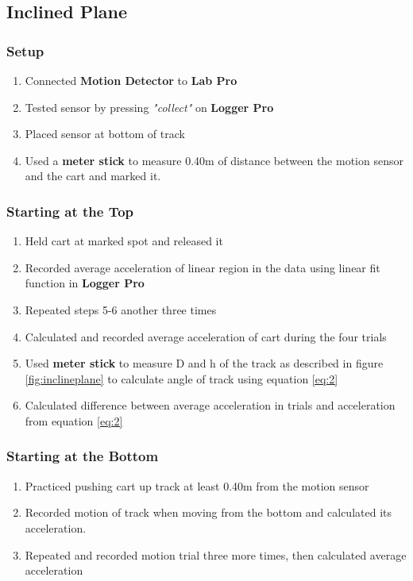 \subsection{Inclined Plane}

\subsubsection{Setup}

	\begin{enumerate}
		\item Connected \textbf{Motion Detector} to \textbf{Lab Pro} 
		\item Tested sensor by pressing \textit{"collect"} on \textbf{Logger Pro}
		\item Placed sensor at bottom of track
		\item Used a \textbf{meter stick} to measure 0.40\thinspace m of distance between the motion sensor and the cart and marked it.
	\end{enumerate}

\subsubsection{Starting at the Top}

	\begin{enumerate}[resume]

	\item Held cart at marked spot and released it
	\item Recorded average acceleration of linear region in the data using linear fit function in \textbf{Logger Pro}
	\item Repeated steps 5-6 another three times 
	\item Calculated and recorded average acceleration of cart during the four trials
	\item Used \textbf{meter stick} to measure D and h of the track as described in figure \ref{fig:inclineplane} to calculate angle of track using equation \eqref{eq:2}
	\item Calculated difference between average acceleration in trials and acceleration from equation \eqref{eq:2}
	\end{enumerate}

	\subsubsection{Starting at the Bottom}

	\begin{enumerate}[resume]
			\item Practiced pushing cart up track at least 0.40\thinspace m from the motion sensor
			\item Recorded motion of track when moving from the bottom and calculated its acceleration.
			\item Repeated and recorded motion trial three more times, then calculated average acceleration
		\end{enumerate}

